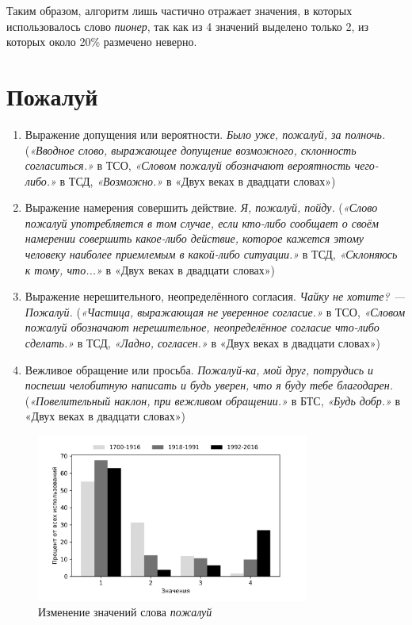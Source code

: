 Таким образом, алгоритм лишь частично отражает значения, в которых использовалось
слово \textit{пионер}, так как из 4 значений выделено только 2, из которых
около 20\% размечено неверно.

\section*{Пожалуй}

\begin{enumerate}
    \item Выражение допущения или вероятности. \textit{Было уже, пожалуй, за полночь.}
(\textit{«Вводное слово, выражающее допущение возможного, склонность согласиться.»} в ТСО,
\textit{«Словом пожалуй обозначают вероятность чего-либо.»} в ТСД,
\textit{«Возможно.»} в «Двух веках в двадцати словах»)

    \item Выражение намерения совершить действие. \textit{Я, пожалуй, пойду.}
(\textit{«Слово пожалуй употребляется в том случае, если кто-либо сообщает о своём намерении
совершить какое-либо действие, которое кажется этому человеку наиболее приемлемым в какой-либо ситуации.»} в ТСД,
\textit{«Склоняюсь к тому, что...»} в «Двух веках в двадцати словах»)

    \item Выражение нерешительного, неопределённого согласия. \textit{Чайку не хотите? — Пожалуй.}
(\textit{«Частица, выражающая не уверенное согласие.»} в ТСО,
\textit{«Словом пожалуй обозначают нерешительное, неопределённое согласие что-либо сделать.»} в ТСД,
\textit{«Ладно, согласен.»} в «Двух веках в двадцати словах»)

    \item Вежливое обращение или просьба. \textit{Пожалуй-ка, мой друг, потрудись и поспеши челобитную написать и будь уверен, что я буду тебе благодарен.}
(\textit{«Повелительный наклон, при вежливом обращении.»} в БТС,
\textit{«Будь добр.»} в «Двух веках в двадцати словах»)
\end{enumerate}

\begin{figure}[H]
	\centering
	\includegraphics[width=0.8\textwidth]{img/visualizations/pozhaluj_minimal}
	\caption{Изменение значений слова \textit{пожалуй}}
	\label{fig:Пожалуй}
\end{figure}


